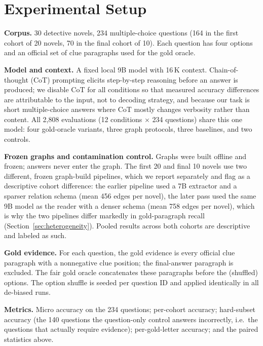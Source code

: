 \documentclass{article}
\begin{document}
\section{Experimental Setup}
\label{sec:setup}

\textbf{Corpus.} 30 detective novels, 234 multiple-choice questions
(164 in the first cohort of 20 novels, 70 in the final cohort of 10). Each
question has four options and an official set of clue paragraphs used for the
gold oracle.

\textbf{Model and context.} A fixed local 9B model with 16\,K context.
Chain-of-thought (CoT) prompting \citep{wei2022chain} elicits step-by-step
reasoning before an answer is produced; we disable CoT for all conditions so
that measured accuracy differences are attributable to the input, not to
decoding strategy, and because our task is short multiple-choice answers where
CoT mostly changes verbosity rather than content. All 2,808 evaluations
(12 conditions $\times$ 234 questions) share this one model: four gold-oracle
variants, three graph protocols, three baselines, and two controls.

\textbf{Frozen graphs and contamination control.} Graphs were built offline and
frozen; answers never enter the graph. The first 20 and final 10 novels use two
different, frozen graph-build pipelines, which we report separately and flag as
a descriptive cohort difference: the earlier pipeline used a 7B extractor and a
sparser relation schema (mean 456 edges per novel), the later pass used the same
9B model as the reader with a denser schema (mean 758 edges per novel), which is
why the two pipelines differ markedly in gold-paragraph recall
(Section~\ref{sec:heterogeneity}). Pooled results across both cohorts are
descriptive and labeled as such.

\textbf{Gold evidence.} For each question, the gold evidence is every official
clue paragraph with a nonnegative clue position; the final-answer paragraph is
excluded. The fair gold oracle concatenates these paragraphs before the
(shuffled) options. The option shuffle is seeded per question ID and applied
identically in all de-biased runs.

\textbf{Metrics.} Micro accuracy on the 234 questions; per-cohort accuracy;
hard-subset accuracy (the 140 questions the question-only control answers
incorrectly, i.e.\ the questions that actually require evidence); per-gold-letter
accuracy; and the paired statistics above.
\end{document}
